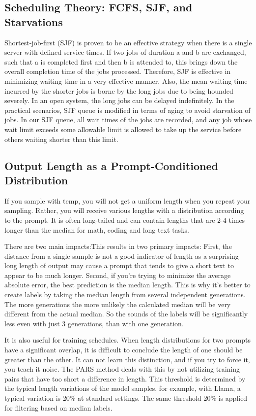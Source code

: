 \documentclass[conference]{IEEEtran}
\begin{document}
\subsection{Scheduling Theory: FCFS, SJF, and Starvations}

Shortest-job-first (SJF) is proven to be an effective strategy when there is a single server with defined service times. If two jobs of duration a and b are exchanged, such that a is completed first and then b is attended to, this brings down the overall completion time of the jobs processed. Therefore, SJF is effective in minimizing waiting time in a very effective manner. Also, the mean waiting time incurred by the shorter jobs is borne by the long jobs due to being hounded severely. In an open system, the long jobs can be delayed indefinitely. In the practical scenarios, SJF queue is modified in terms of aging to avoid starvation of jobs. In our SJF queue, all wait times of the jobs are recorded, and any job whose wait limit exceeds some allowable limit is allowed to take up the service before others waiting shorter than this limit.

\subsection{Output Length as a Prompt-Conditioned Distribution}
If you sample with temp, you will not get a uniform length when you repeat your sampling. Rather, you will receive various lengths with a distribution according to the prompt. It is often long-tailed and can contain lengths that are 2-4 times longer than the median for math, coding and long text tasks.

There are two main impacts:This results in two primary impacts: First, the distance from a single sample is not a good indicator of length as a surprising long length of output may cause a prompt that tends to give a short text to appear to be much longer. Second, if you're trying to minimize the average absolute error, the best prediction is the median length. This is why it's better to create labels by taking the median length from several independent generations. The more generations the more unlikely the calculated median will be very different from the actual median. So the sounds of the labels will be significantly less even with just 3 generations, than with one generation.

It is also useful for training schedules. When length distributions for two prompts have a significant overlap, it is difficult to conclude the length of one should be greater than the other. It can not learn this distinction, and if you try to force it, you teach it noise. The PARS method deals with this by not utilizing training pairs that have too short a difference in length. This threshold is determined by the typical length variations of the model samples, for example, with Llama, a typical variation is 20\% at standard settings. The same threshold 20\% is applied for filtering based on median labels.
\end{document}
